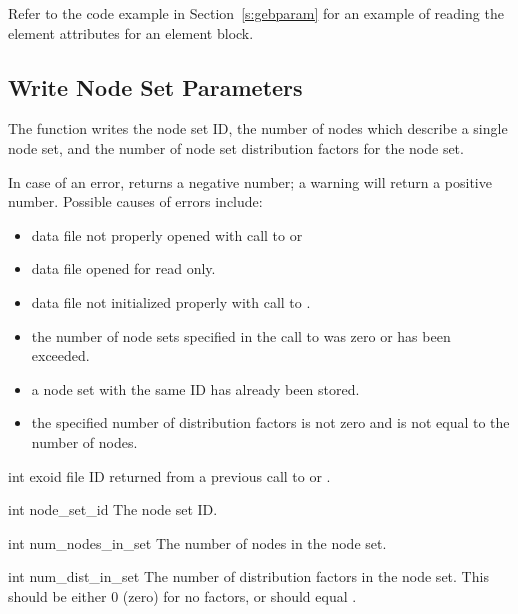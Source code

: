 Refer to the code example in Section~\ref{s:gebparam} for an example
of reading the element attributes for an element block.

\subsection{Write Node Set Parameters}

The function  writes the node set ID,
the number of nodes which describe a single node set, and the number
of node set distribution factors for the node set.

In case of an error,  returns a
negative number; a warning will return a positive number.  Possible
causes of errors include:

\begin{itemize}
 \item data file not properly opened with call to 
 or 

 \item data file opened for read only.

 \item data file not initialized properly with call to
 .

 \item the number of node sets specified in the call to
  was zero or has been exceeded.

 \item a node set with the same ID has already been stored.

 \item the specified number of distribution factors is not zero and is
 not equal to the number of nodes.
\end{itemize}



\begin{parameters}
\item[{int exoid \R{}}]
\exo{} file ID returned from a previous call to  or
.

\item[{int node_set_id \R{}}]
The node set ID.

\item[{int num_nodes_in_set \R{}}]
The number of nodes in the node set.

\item[{int num_dist_in_set \R{}}]
The number of distribution factors in the node set. This should be
either 0 (zero) for no factors, or should equal .
\end{parameters}

